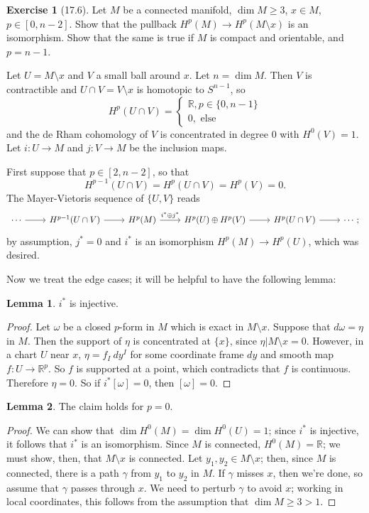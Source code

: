 \documentclass[10pt]{article}
\newcommand{\RR}{\mathbb{R}}
\theoremstyle{definition}
\newtheorem{exer}{Exercise}
\newtheorem{lemma}{Lemma}[exer]
\begin{document}
\begin{exer}[17.6]
Let $M$ be a connected manifold, $\dim M \geq 3$, $x \in M$, $p \in [0, n - 2]$.
Show that the pullback $H^p(M) \to H^p(M \setminus x)$ is an isomorphism.
Show that the same is true if $M$ is compact and orientable, and $p = n - 1$.
\end{exer}

Let $U = M \setminus x$ and $V$ a small ball around $x$.
Let $n = \dim M$.
Then $V$ is contractible and $U \cap V = V \setminus x$ is homotopic to $S^{n-1}$, so
$$H^p(U \cap V) = \begin{cases}
\RR, p \in \{0, n - 1\}\\
0, \text{ else}
\end{cases}$$
and the de Rham cohomology of $V$ is concentrated in degree $0$ with $H^0(V) = 1$.
Let $i: U \to M$ and $j: V \to M$ be the inclusion maps.

First suppose that $p \in [2, n - 2]$, so that
$$H^{p-1}(U \cap V) = H^p(U \cap V) = H^p(V) = 0.$$
The Mayer-Vietoris sequence of $\{U, V\}$ reads
$$\begin{tikzcd}
\cdots \arrow[r] & H^{p-1}(U \cap V) \arrow[r] & H^p(M) \arrow[r,"i^* \oplus j^*"] & H^p(U) \oplus H^p(V) \arrow[r] & H^p(U \cap V) \arrow[r] & \cdots;
\end{tikzcd}$$
by assumption, $j^* = 0$ and $i^*$ is an isomorphism $H^p(M) \to H^p(U)$, which was desired.

Now we treat the edge cases; it will be helpful to have the following lemma:
\begin{lemma}
$i^*$ is injective.
\end{lemma}
\begin{proof}
Let $\omega$ be a closed $p$-form in $M$ which is exact in $M \setminus x$. Suppose that $d\omega = \eta$ in $M$. Then the support of $\eta$ is concentrated at $\{x\}$, since $\eta|M \setminus x = 0$.
However, in a chart $U$ near $x$, $\eta = f_I ~dy^I$ for some coordinate frame $dy$ and smooth map $f: U \to \RR^p$.
So $f$ is supported at a point, which contradicts that $f$ is continuous.
Therefore $\eta = 0$.
So if $i^*[\omega] = 0$, then $[\omega] = 0$.
\end{proof}

\begin{lemma}
The claim holds for $p = 0$.
\end{lemma}
\begin{proof}
We can show that $\dim H^0(M) = \dim H^0(U) = 1$; since $i^*$ is injective, it follows that $i^*$ is an isomorphism.
Since $M$ is connected, $H^0(M) = \RR$; we must show, then, that $M \setminus x$ is connected.
Let $y_1, y_2 \in M \setminus x$; then, since $M$ is connected, there is a path $\gamma$ from $y_1$ to $y_2$ in $M$.
If $\gamma$ misses $x$, then we're done, so assume that $\gamma$ passes through $x$.
We need to perturb $\gamma$ to avoid $x$; working in local coordinates, this follows from the assumption that $\dim M \geq 3 > 1$.
\end{proof}
\end{document}
